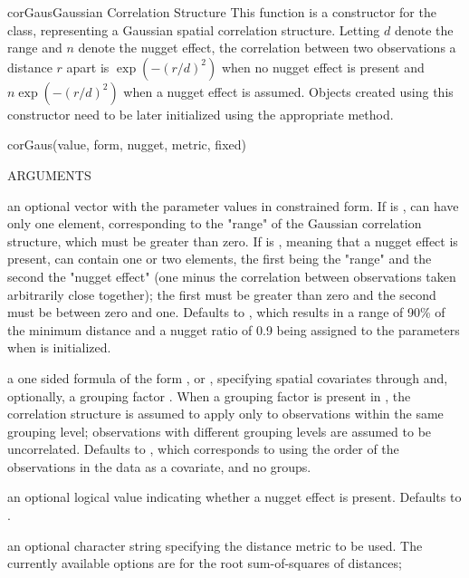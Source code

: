 \documentclass[pdftex]{article} \usepackage{url,graphicx}
\renewcommand{\Twiddle}{\mbox{\(\sim\)}}
\begin{document}
\begin{Helpfile}{corGaus}{Gaussian Correlation Structure}
This function is a constructor for the  class,
representing a Gaussian spatial correlation structure. Letting
$d$ denote the range and $n$ denote the nugget
effect, the correlation between two observations a distance
$r$ apart is $\exp(-(r/d)^2)$ when no nugget
effect is present and $n\exp(-(r/d)^2)$ when a
nugget effect is assumed. Objects created using this constructor need
to be later initialized using the appropriate  method.
\begin{Example}
corGaus(value, form, nugget, metric, fixed)
\end{Example}
\begin{Argument}{ARGUMENTS}
\item[\Co{value:}] an optional vector with the parameter values in
  constrained form. If  is ,  can have
  only one element, corresponding to the "range" of the Gaussian
  correlation structure, which must be greater than zero. If
   is , meaning that a nugget effect is present,
   can contain one or two elements, the first being the
  "range" and the second the "nugget effect" (one minus the
  correlation between observations taken arbitrarily close together);
  the first must be greater than zero and the second must be between
  zero and one. Defaults to , which results in a range
  of 90\% of the minimum distance and a nugget ratio of 0.9 being
  assigned to the parameters when  is initialized.
\item[\Co{form:}]
a one sided formula of the form \Co{{\Twiddle} S1+...+Sp}, or
\Co{{\Twiddle} S1+...+Sp | g}, specifying spatial covariates 
through  and,  optionally, a grouping factor . 
When a grouping factor is present in , the correlation
structure is assumed to apply only to observations within the same
grouping level; observations with different grouping levels are
assumed to be uncorrelated. Defaults to \Co{{\Twiddle} 1}, which corresponds
to using the order of the observations in the data as a covariate,
and no groups.
\item[\Co{nugget:}]
an optional logical value indicating whether a nugget
effect is present. Defaults to .
\item[\Co{metric:}]
an optional character string specifying the distance
metric to be used. The currently available options are
 for the root sum-of-squares of distances;

\end{Argument}
\end{Helpfile}
\end{document}
